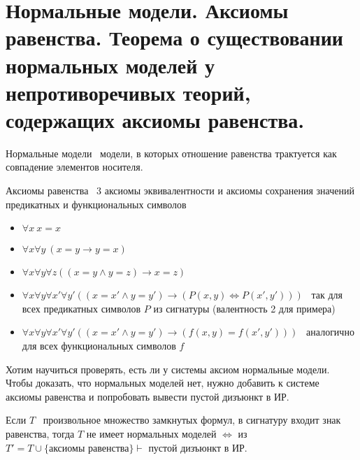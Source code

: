\documentclass{article}
\begin{document}
\section{Нормальные модели. Аксиомы равенства. Теорема о существовании нормальных моделей у непротиворечивых теорий, содержащих аксиомы равенства.}

\begin{definition}
	Нормальные модели \textemdash\ модели, в которых отношение равенства трактуется как совпадение элементов носителя.
\end{definition}

\begin{definition}
	Аксиомы равенства \textemdash\ 3 аксиомы эквивалентности и аксиомы сохранения значений предикатных и функциональных символов
\end{definition}
\begin{itemize}
	\item $\forall x\ x = x$
	\item $\forall x \forall y\ (x = y \rightarrow y = x)$
	\item $\forall x \forall y \forall z ((x = y \wedge y = z) \rightarrow x = z)$
	\item $\forall x \forall y \forall x' \forall y' ((x = x' \wedge y = y') \rightarrow (P(x, y) \iff P(x', y')))$ \textemdash\ так для всех предикатных символов $P$ из сигнатуры (валентность 2 для примера)
	\item $\forall x \forall y \forall x' \forall y' ((x = x' \wedge y = y') \rightarrow (f(x, y) = f(x', y')))$ \textemdash\ аналогично для всех функциональных символов $f$
\end{itemize}

Хотим научиться проверять, есть ли у системы аксиом нормальные модели. Чтобы доказать, что нормальных моделей нет, нужно добавить к системе аксиомы равенства и попробовать вывести пустой дизъюнкт в ИР. 

\begin{theorem}
	Если $T$ \textemdash\ произвольное множество замкнутых формул, в сигнатуру входит знак равенства, тогда $T$ не имеет нормальных моделей $\iff$ из $T' = T \cup \{\text{аксиомы равенства}\} \vdash $ пустой дизъюнкт в ИР.
\end{theorem}
\end{document}
